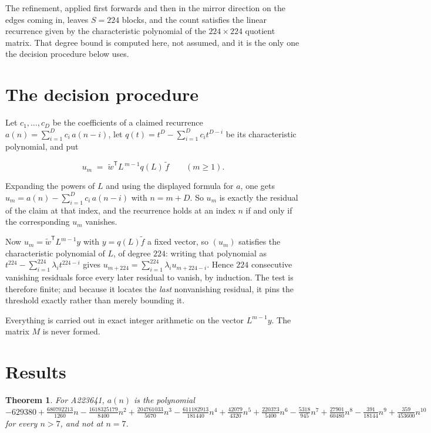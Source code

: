\documentclass[11pt]{article}
\newtheorem{theorem}{Theorem}
\theoremstyle{definition}
\begin{document}
The refinement, applied first forwards and then in the mirror direction on the edges coming in, leaves $S = 224$ blocks, and the count satisfies the linear recurrence given by the characteristic polynomial of the $224 \times 224$ quotient matrix. That degree bound is computed here, not assumed, and it is the only one the decision procedure below uses.

\section{The decision procedure}

Let $c_1,\dots,c_D$ be the coefficients of a claimed recurrence $a(n) = \sum_{i=1}^{D} c_i\,a(n-i)$, let $q(t) = t^{D} - \sum_{i=1}^{D} c_i t^{D-i}$ be its characteristic polynomial, and put

\[u_m \;=\; \tilde w^{\mathsf T} L^{\,m-1} q(L)\,\tilde f \qquad (m \ge 1).\]

Expanding the powers of $L$ and using the displayed formula for $a$, one gets $u_m = a(n) - \sum_{i=1}^{D} c_i\,a(n-i)$ with $n = m + D$. So $u_m$ is exactly the residual of the claim at that index, and the recurrence holds at an index $n$ if and only if the corresponding $u_m$ vanishes.

Now $u_m = \tilde w^{\mathsf T} L^{m-1} y$ with $y = q(L)\tilde f$ a fixed vector, so $(u_m)$ satisfies the characteristic polynomial of $L$, of degree $224$: writing that polynomial as $t^{224} - \sum_{i=1}^{224} \lambda_i t^{224-i}$ gives $u_{m+224} = \sum_{i=1}^{224} \lambda_i u_{m+224-i}$. Hence $224$ consecutive vanishing residuals force every later residual to vanish, by induction. The test is therefore finite; and because it locates the {\itshape last} nonvanishing residual, it pins the threshold exactly rather than merely bounding it.

Everything is carried out in exact integer arithmetic on the vector $L^{m-1}y$. The matrix $M$ is never formed.

\section{Results}

\begin{theorem} For A223641, $a(n)$ is the polynomial $-629380 + \frac{680702213}{1260}n - \frac{1618325179}{8400}n^{2} + \frac{204761033}{5670}n^{3} - \frac{611182913}{181440}n^{4} + \frac{42079}{4320}n^{5} + \frac{220373}{5400}n^{6} - \frac{5318}{945}n^{7} + \frac{27901}{60480}n^{8} - \frac{391}{18144}n^{9} + \frac{359}{453600}n^{10}$ for every $n > 7$, and not at $n = 7$.\end{theorem}
\end{document}
